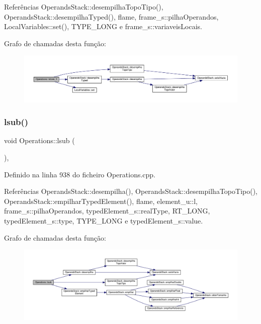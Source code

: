 Referências Operands\+Stack\+::desempilha\+Topo\+Tipo(), Operands\+Stack\+::desempilha\+Typed(), flame, frame\+\_\+s\+::pilha\+Operandos, Local\+Variables\+::set(), T\+Y\+P\+E\+\_\+\+L\+O\+NG e frame\+\_\+s\+::variaveis\+Locais.

Grafo de chamadas desta função\+:
\nopagebreak
\begin{figure}[H]
\begin{center}
\leavevmode
\includegraphics[width=350pt]{classOperations_a00d5ca7ea5a68e9cccfdc26b11a716bf_cgraph}
\end{center}
\end{figure}
\mbox{\label{classOperations_a32485b21761b1e5540a6575822a2661a}} 
\subsubsection{\texorpdfstring{lsub()}{lsub()}}
{\footnotesize\ttfamily void Operations\+::lsub (\begin{DoxyParamCaption}{ }\end{DoxyParamCaption})\hspace{0.3cm}{\ttfamily [static]}, {\ttfamily [private]}}



Definido na linha 938 do ficheiro Operations.\+cpp.



Referências Operands\+Stack\+::desempilha(), Operands\+Stack\+::desempilha\+Topo\+Tipo(), Operands\+Stack\+::empilhar\+Typed\+Element(), flame, element\+\_\+u\+::l, frame\+\_\+s\+::pilha\+Operandos, typed\+Element\+\_\+s\+::real\+Type, R\+T\+\_\+\+L\+O\+NG, typed\+Element\+\_\+s\+::type, T\+Y\+P\+E\+\_\+\+L\+O\+NG e typed\+Element\+\_\+s\+::value.

Grafo de chamadas desta função\+:
\nopagebreak
\begin{figure}[H]
\begin{center}
\leavevmode
\includegraphics[width=350pt]{classOperations_a32485b21761b1e5540a6575822a2661a_cgraph}
\end{center}
\end{figure}
\mbox{\label{classOperations_a3b7c61f8bca7b3ad0dacae6649aee042}} 

